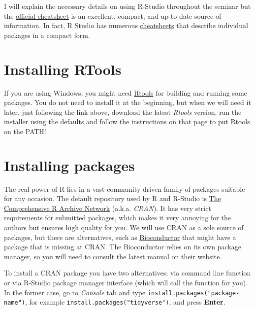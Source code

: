 \documentclass[
]{book}
\begin{document}
I will explain the necessary details on using R-Studio throughout the seminar but the \href{https://github.com/rstudio/cheatsheets/raw/master/rstudio-ide.pdf}{official cheatsheet} is an excellent, compact, and up-to-date source of information. In fact, R Studio has numerous \href{https://rstudio.com/resources/cheatsheets/}{cheatsheets} that describe individual packages in a compact form.

\hypertarget{install-rtools}{%
\section{Installing RTools}\label{install-rtools}}

If you are using Windows, you might need \href{https://cran.r-project.org/bin/windows/Rtools/}{Rtools} for building and running some packages. You do not need to install it at the beginning, but when we will need it later, just following the link above, download the latest \emph{Rtools} version, run the installer using the defaults and follow the instructions on that page to put Rtools on the PATH!

\hypertarget{install.packages}{%
\section*{Installing packages}\label{install.packages}}

The real power of R lies in a vast community-driven family of packages suitable for any occasion. The default repository used by R and R-Studio is \href{https://cran.r-project.org/}{The Comprehensive R Archive Network} (a.k.a. \emph{CRAN}). It has very strict requirements for submitted packages, which makes it very annoying for the authors but ensures high quality for you. We will use CRAN as a sole source of packages, but there are alternatives, such as \href{http://www.bioconductor.org/}{Bioconductor} that might have a package that is missing at CRAN. The Bioconductor relies on its own package manager, so you will need to consult the latest manual on their website.

To install a CRAN package you have two alternatives: via command line function or via R-Studio package manager interface (which will call the function for you). In the former case, go to \emph{Console} tab and type \texttt{install.packages("package-name")}, for example \texttt{install.packages("tidyverse")}, and press \textbf{Enter}.
\end{document}
